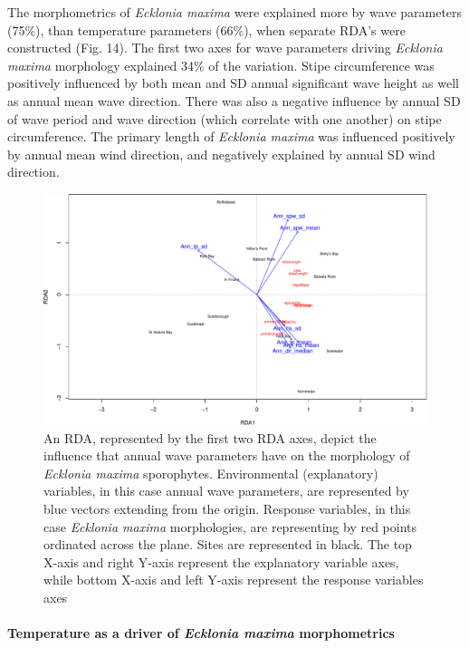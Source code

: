 \documentclass[10pt,a4,]{article}
\makeatletter
\def\maxwidth{\ifdim\Gin@nat@width>\linewidth\linewidth
\else\Gin@nat@width\fi}
\let\Oldincludegraphics\includegraphics
\renewcommand{\includegraphics}[1]{\Oldincludegraphics[width=\maxwidth]{#1}}
\makeatother
\begin{document}
The morphometrics of \emph{Ecklonia maxima} were explained more by wave
parameters (75\%), than temperature parameters (66\%), when separate
RDA's were constructed (Fig. 14). The first two axes for wave parameters
driving \emph{Ecklonia maxima} morphology explained 34\% of the
variation. Stipe circumference was positively influenced by both mean
and SD annual significant wave height as well as annual mean wave
direction. There was also a negative influence by annual SD of wave
period and wave direction (which correlate with one another) on stipe
circumference. The primary length of \emph{Ecklonia maxima} was
influenced positively by annual mean wind direction, and negatively
explained by annual SD wind direction.

\begin{figure}
\centering
\includegraphics{chapter_2_files/figure-latex/unnamed-chunk-25-1.pdf}
\caption{An RDA, represented by the first two RDA axes, depict the
influence that annual wave parameters have on the morphology of
\emph{Ecklonia maxima} sporophytes. Environmental (explanatory)
variables, in this case annual wave parameters, are represented by blue
vectors extending from the origin. Response variables, in this case
\emph{Ecklonia maxima} morphologies, are representing by red points
ordinated across the plane. Sites are represented in black. The top
X-axis and right Y-axis represent the explanatory variable axes, while
bottom X-axis and left Y-axis represent the response variables axes}
\end{figure}

\hypertarget{temperature-as-a-driver-of-ecklonia-maxima-morphometrics}{%
\paragraph{\texorpdfstring{Temperature as a driver of \emph{Ecklonia
maxima}
morphometrics}{Temperature as a driver of Ecklonia maxima morphometrics}}\label{temperature-as-a-driver-of-ecklonia-maxima-morphometrics}}
\end{document}
